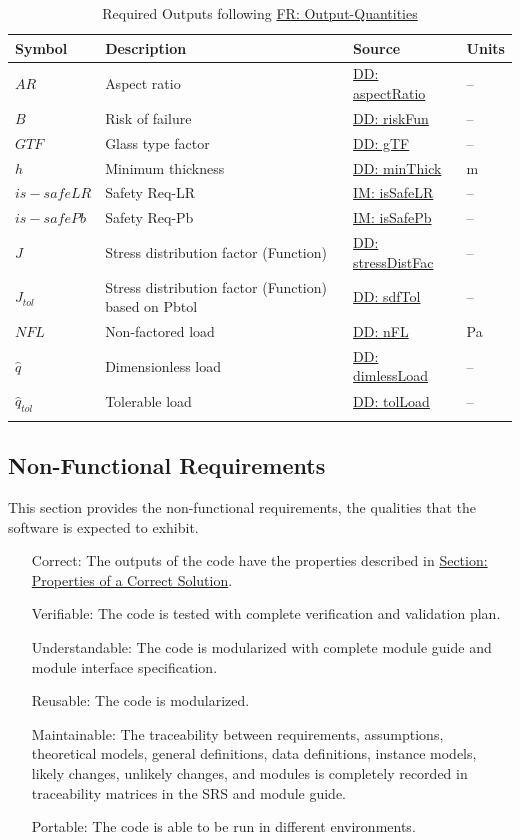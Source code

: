 \documentclass[12pt]{article}
\begin{document}
\begin{longtabu}{l X[l] l l}
\toprule
\textbf{Symbol} & \textbf{Description} & \textbf{Source} & \textbf{Units}
\\
\midrule
\endhead
$AR$ & Aspect ratio & \hyperref[DD:aspectRatio]{DD: aspectRatio} & --
\\
$B$ & Risk of failure & \hyperref[DD:riskFun]{DD: riskFun} & --
\\
$GTF$ & Glass type factor & \hyperref[DD:gTF]{DD: gTF} & --
\\
$h$ & Minimum thickness & \hyperref[DD:minThick]{DD: minThick} & m
\\
$is-safeLR$ & Safety Req-LR & \hyperref[IM:isSafeLR]{IM: isSafeLR} & --
\\
$is-safePb$ & Safety Req-Pb & \hyperref[IM:isSafePb]{IM: isSafePb} & --
\\
$J$ & Stress distribution factor (Function) & \hyperref[DD:stressDistFac]{DD: stressDistFac} & --
\\
${J_{tol}}$ & Stress distribution factor (Function) based on Pbtol & \hyperref[DD:sdfTol]{DD: sdfTol} & --
\\
$NFL$ & Non-factored load & \hyperref[DD:nFL]{DD: nFL} & Pa
\\
$\hat{q}$ & Dimensionless load & \hyperref[DD:dimlessLoad]{DD: dimlessLoad} & --
\\
${\hat{q}_{tol}}$ & Tolerable load & \hyperref[DD:tolLoad]{DD: tolLoad} & --
\\
\bottomrule
\caption{Required Outputs following \hyperref[outputQuants]{FR: Output-Quantities}}
\label{Table:ReqOutputs}
\end{longtabu}
\subsection{Non-Functional Requirements}
\label{Sec:NFRs}
This section provides the non-functional requirements, the qualities that the software is expected to exhibit.
\begin{itemize}
\item[Correct:\phantomsection\label{correct}]{The outputs of the code have the properties described in \hyperref[Sec:CorSolProps]{Section: Properties of a Correct Solution}.}
\item[Verifiable:\phantomsection\label{verifiable}]{The code is tested with complete verification and validation plan.}
\item[Understandable:\phantomsection\label{understandable}]{The code is modularized with complete module guide and module interface specification.}
\item[Reusable:\phantomsection\label{reusable}]{The code is modularized.}
\item[Maintainable:\phantomsection\label{maintainable}]{The traceability between requirements, assumptions, theoretical models, general definitions, data definitions, instance models, likely changes, unlikely changes, and modules is completely recorded in traceability matrices in the SRS and module guide.}
\item[Portable:\phantomsection\label{portable}]{The code is able to be run in different environments.}
\end{itemize}
\end{document}
